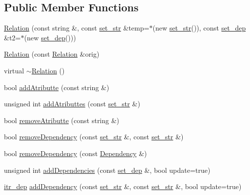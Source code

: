 \subsection*{Public Member Functions}
\begin{DoxyCompactItemize}
\item 
\hyperlink{class_relation_ae4e5fbc5744656e2949aa339a3a20809}{Relation} (const string \&, const \hyperlink{typedef_8h_aa234bdb39b1698c1d4955072cfb3195f}{set\+\_\+str} \&temp=$\ast$(new \hyperlink{typedef_8h_aa234bdb39b1698c1d4955072cfb3195f}{set\+\_\+str}()), const \hyperlink{typedef_8h_a49fdcf14d2faf54629fca98482b2dfb9}{set\+\_\+dep} \&t2=$\ast$(new \hyperlink{typedef_8h_a49fdcf14d2faf54629fca98482b2dfb9}{set\+\_\+dep}()))
\item 
\hyperlink{class_relation_ae36aedb2fbe0084795d577a58ae44a3b}{Relation} (const \hyperlink{class_relation}{Relation} \&orig)
\item 
virtual \hyperlink{class_relation_ad8bc5c349f9d98b15972fd0b09f341cc}{$\sim$\+Relation} ()
\item 
bool \hyperlink{class_relation_ab4fd894562cf6b53bf207e6b5c1093ff}{add\+Atributte} (const string \&)
\item 
unsigned int \hyperlink{class_relation_aeb703bd9672bba59a283c86d3d718e5c}{add\+Atributtes} (const \hyperlink{typedef_8h_aa234bdb39b1698c1d4955072cfb3195f}{set\+\_\+str} \&)
\item 
bool \hyperlink{class_relation_a919e9f07b7f8bb2f1119b25f301d9f1c}{remove\+Atributte} (const string \&)
\item 
bool \hyperlink{class_relation_abf6483df38b205939024c7f4e93bf890}{remove\+Dependency} (const \hyperlink{typedef_8h_aa234bdb39b1698c1d4955072cfb3195f}{set\+\_\+str} \&, const \hyperlink{typedef_8h_aa234bdb39b1698c1d4955072cfb3195f}{set\+\_\+str} \&)
\item 
bool \hyperlink{class_relation_a1cee25dae94b1bb7ed1ce12592fbbd8b}{remove\+Dependency} (const \hyperlink{class_dependency}{Dependency} \&)
\item 
unsigned int \hyperlink{class_relation_aba0be8b3cfe8d57a77ac0cf1bc2eee49}{add\+Dependencies} (const \hyperlink{typedef_8h_a49fdcf14d2faf54629fca98482b2dfb9}{set\+\_\+dep} \&, bool update=true)
\item 
\hyperlink{typedef_8h_ab78cecb3657d8a4377c1f9e4dba8778c}{itr\+\_\+dep} \hyperlink{class_relation_a9b15b6309a27f5621039ae7e375bea95}{add\+Dependency} (const \hyperlink{typedef_8h_aa234bdb39b1698c1d4955072cfb3195f}{set\+\_\+str} \&, const \hyperlink{typedef_8h_aa234bdb39b1698c1d4955072cfb3195f}{set\+\_\+str} \&, bool update=true)

\end{DoxyCompactItemize}

